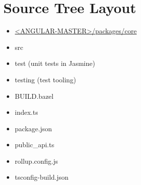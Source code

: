 \section{Source Tree Layout}


\begin{itemize}
  \item \href{https://github.com/angular/angular/tree/master/packages/core}
        {<ANGULAR-MASTER>/packages/core}
\end{itemize}


\begin{itemize}
  \item src
  \item test (unit tests in Jasmine)
  \item testing (test tooling)
\end{itemize}


\begin{itemize}
  \item BUILD.bazel
  \item index.ts
  \item package.json
  \item public\_api.ts
  \item rollup.config.js
  \item tsconfig-build.json
\end{itemize}
